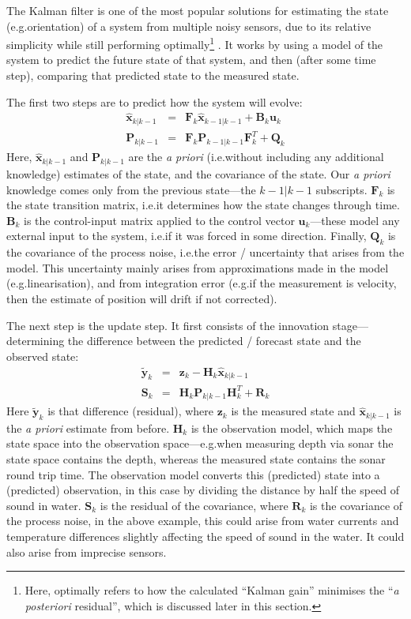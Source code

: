 \documentclass[12pt]{article}
\begin{document}
The Kalman filter \cite{kalman_1960} is one of the most popular solutions for estimating the state (e.g.\@ orientation) of a system from multiple noisy sensors, due to its relative simplicity while still performing optimally\footnote{Here, optimally refers to how the calculated ``Kalman gain'' minimises the ``\emph{a posteriori} residual'', which is discussed later in this section.} \cite{wangyan_2015}. It works by using a model of the system to predict the future state of that system, and then (after some time step), comparing that predicted state to the measured state.

The first two steps are to predict how the system will evolve:
\begin{eqnarray}
	\mathbf{\hat{x}}_{k | k-1} &=& \mathbf{F}_k \mathbf{\hat{x}}_{k-1|k-1} + \mathbf{B}_k \mathbf{u}_k\\
	\mathbf{P}_{k|k-1} &=& \mathbf{F}_k \mathbf{P}_{k-1 | k-1} \mathbf{F}^T_k + \mathbf{Q}_k
\end{eqnarray}
Here, $\mathbf{\hat{x}}_{k | k-1}$ and $\mathbf{P}_{k|k-1}$ are the \emph{a priori} (i.e.\@ without including any additional knowledge) estimates of the state, and the covariance of the state. Our \emph{a priori} knowledge comes only from the previous state---the $k-1|k-1$ subscripts. $\mathbf{F}_k$ is the state transition matrix, i.e.\@ it determines how the state changes through time. $\mathbf{B}_k$ is the control-input matrix applied to the control vector $\mathbf{u}_k$---these model any external input to the system, i.e.\@ if it was forced in some direction. Finally, $\mathbf{Q}_k$ is the covariance of the process noise, i.e.\@ the error / uncertainty that arises from the model. This uncertainty mainly arises from approximations made in the model (e.g.\@ linearisation), and from integration error (e.g.\@ if the measurement is velocity, then the estimate of position will drift if not corrected).

The next step is the update step. It first consists of the innovation stage---determining the difference between the predicted / forecast state and the observed state:
\begin{eqnarray}
	\mathbf{\tilde{y}}_k &=& \mathbf{z}_k - \mathbf{H}_k \mathbf{\hat{x}}_{k|k-1} \\
	\mathbf{S}_k &=& \mathbf{H}_k \mathbf{P}_{k|k-1} \mathbf{H}^T_k + \mathbf{R}_k 
\end{eqnarray}
Here $\mathbf{\tilde{y}}_k$ is that difference (residual), where $\mathbf{z}_k$ is the measured state and $\mathbf{\hat{x}}_{k|k-1}$ is the \emph{a priori} estimate from before. $\mathbf{H}_k$ is the observation model, which maps the state space into the observation space---e.g.\@ when measuring depth via sonar the state space contains the depth, whereas the measured state contains the sonar round trip time. The observation model converts this (predicted) state into a (predicted) observation, in this case by dividing the distance by half the speed of sound in water. $\mathbf{S}_k$ is the residual of the covariance, where $\mathbf{R}_k$ is the covariance of the process noise, in the above example, this could arise from water currents and temperature differences slightly affecting the speed of sound in the water. It could also arise from imprecise sensors.
\end{document}
